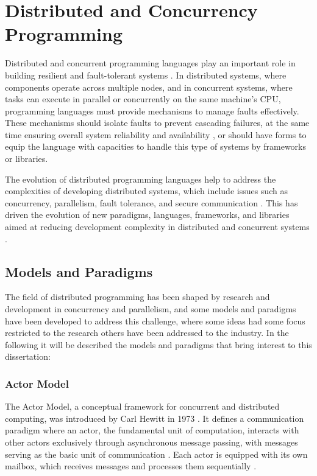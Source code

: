 

\section{Distributed and Concurrency Programming}

Distributed and concurrent programming languages play an important role in building resilient and fault-tolerant systems \cite{Armstrong2013}. In distributed systems, where components operate across multiple nodes, and in concurrent systems, where tasks can execute in parallel or concurrently on the same machine's \gls{CPU}, programming languages must provide mechanisms to manage faults effectively. These mechanisms should isolate faults to prevent cascading failures, at the same time ensuring overall system reliability and availability \cite{Nystrom2009}, or should have forms to equip the language with capacities to handle this type of systems by frameworks or libraries.

The evolution of distributed programming languages help to address the complexities of developing distributed systems, which include issues such as concurrency, parallelism, fault tolerance, and secure communication \cite{Armstrong2013}. This has driven the evolution of new paradigms, languages, frameworks, and libraries aimed at reducing development complexity in distributed and concurrent systems \cite{Valkov2018}.

\subsection{Models and Paradigms}

The field of distributed programming has been shaped by research and development in concurrency and parallelism, and some models and paradigms have been developed to address this challenge, where some ideas had some focus restricted to the research others have been addressed to the industry. In the following it will be described the models and paradigms that bring interest to this dissertation:

\subsubsection{Actor Model}

The Actor Model, a conceptual framework for concurrent and distributed computing, was introduced by Carl Hewitt in 1973 \cite{Hewitt1973}. It defines a communication paradigm where an actor, the fundamental unit of computation, interacts with other actors exclusively through asynchronous message passing, with messages serving as the basic unit of communication \cite{Trinder2017}. Each actor is equipped with its own mailbox, which receives messages and processes them sequentially \cite{Koster2016}.

